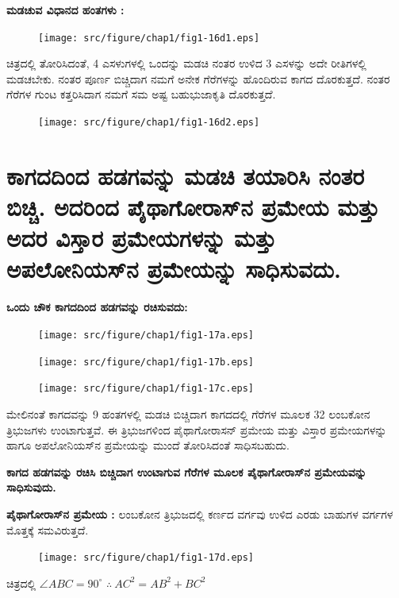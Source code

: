 \vfill\eject


\noindent
\textbf{ಮಡಚುವ ವಿಧಾನದ ಹಂತಗಳು :}
\begin{figure}[H]
\centering
\texttt{[image: src/figure/chap1/fig1-16d1.eps]}
\end{figure}
 
 ಚಿತ್ರದಲ್ಲಿ ತೋರಿಸಿದಂತೆ, 4 ಎಸಳುಗಳಲ್ಲಿ ಒಂದನ್ನು ಮಡಚಿ ನಂತರ ಉಳಿದ 3 ಎಸ\-ಳನ್ನು ಅದೇ ರೀತಿಗಳಲ್ಲಿ ಮಡಚಬೇಕು. ನಂತರ ಪೂರ್ಣ ಬಿಚ್ಚಿದಾಗ ನಮಗೆ ಅನೇಕ ಗೆರೆಗಳನ್ನು ಹೊಂದಿರುವ ಕಾಗದ ದೊರಕುತ್ತದೆ. ನಂತರ ಗೆರೆಗಳ ಗುಂಟ ಕತ್ತರಿಸಿದಾಗ ನಮಗೆ ಸಮ ಅಷ್ಟ ಬಹುಭುಜಾಕೃತಿ ದೊರಕುತ್ತದೆ. 
 \begin{figure}[H]
\centering
\texttt{[image: src/figure/chap1/fig1-16d2.eps]}
\end{figure}



\section{ಕಾಗದದಿಂದ ಹಡಗವನ್ನು ಮಡಚಿ ತಯಾರಿಸಿ ನಂತರ ಬಿಚ್ಚಿ. ಅದರಿಂದ ಪೈಥಾಗೋರಾಸ್‌ನ ಪ್ರಮೇಯ ಮತ್ತು ಅದರ ವಿಸ್ತಾರ ಪ್ರಮೇಯಗಳನ್ನು ಮತ್ತು ಅಪಲೋನಿಯಸ್‌ನ ಪ್ರಮೇಯನ್ನು ಸಾಧಿಸುವದು.}\label{sec1.10} %


\eject
\textbf{ಒಂದು ಚೌಕ ಕಾಗದದಿಂದ ಹಡಗವನ್ನು ರಚಿಸುವದು:}
\begin{figure}[H]
\centering
\texttt{[image: src/figure/chap1/fig1-17a.eps]}
\end{figure}
\begin{figure}[H]
\centering
\texttt{[image: src/figure/chap1/fig1-17b.eps]}
\end{figure}
\begin{figure}[H]
\centering
\texttt{[image: src/figure/chap1/fig1-17c.eps]}
\end{figure}

ಮೇಲಿನಂತೆ ಕಾಗದವನ್ನು 9 ಹಂತಗಳಲ್ಲಿ ಮಡಚಿ ಬಿಚ್ಚಿದಾಗ ಕಾಗದದಲ್ಲಿ ಗೆರೆಗಳ ಮೂಲಕ 32 ಲಂಬಕೋನ ತ್ರಿಭುಜಗಳು ಉಂಟಾಗುತ್ತವೆ. ಈ ತ್ರಿಭುಜಗಳಿಂದ ಪೈಥಾಗೋರಾಸನ್ ಪ್ರಮೇಯ ಮತ್ತು ವಿಸ್ತಾರ ಪ್ರಮೇಯಗಳನ್ನು ಹಾಗೂ ಅಪಲೋನಿಯಸ್‌ನ ಪ್ರಮೇಯನ್ನು ಮುಂದೆ ತೋರಿಸಿದಂತೆ ಸಾಧಿಸಬಹುದು. 

\textbf{ಕಾಗದ ಹಡಗವನ್ನು ರಚಿಸಿ ಬಿಚ್ಚಿದಾಗ ಉಂಟಾಗುವ ಗೆರೆಗಳ ಮೂಲಕ ಪೈಥಾಗೋರಾಸ್‌ನ ಪ್ರಮೇಯವನ್ನು ಸಾಧಿಸುವುದು.}

\noindent
\textbf{ಪೈಥಾಗೋರಾಸ್‌ನ ಪ್ರಮೇಯ :} ಲಂಬಕೋನ ತ್ರಿಭುಜದಲ್ಲಿ ಕರ್ಣದ ವರ್ಗವು ಉಳಿದ ಎರಡು ಬಾಹುಗಳ ವರ್ಗಗಳ ಮೊತ್ತಕ್ಕೆ ಸಮವಿರುತ್ತದೆ. 
\begin{figure}[H]
\centering
\texttt{[image: src/figure/chap1/fig1-17d.eps]}
\end{figure}

ಚಿತ್ರದಲ್ಲಿ $\angle ABC = 90^\circ$ $\therefore ~ AC^2 =  AB^2 +  BC^2 $

